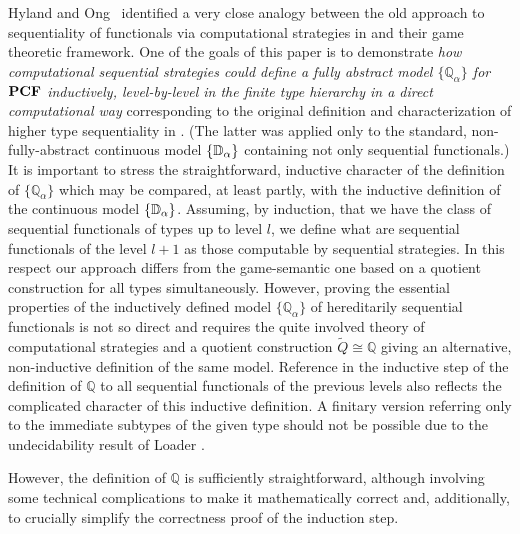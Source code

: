 \documentclass[fleqn]{LMCS}
\theoremstyle{plain}\newtheorem{satz}[thm]{Satz}
\theoremstyle{plain}\newtheorem{hyp}[thm]{Hypothesis}
\theoremstyle{plain}\newtheorem{hyps}[thm]{Hypotheses}
\theoremstyle{definition}\newtheorem{note}[thm]{Note}
\newcommand{\setof}[1]{\{#1\}}
\newcommand{\bbQ}{\mathbb{Q}}
\newcommand{\PCF}{\mbox{\bf PCF}}
\newcommand{\fla}[1]{$#1$}
\newcommand{\tQ}{\tilde{Q}}
\newcommand{\?}{\mbox{?}}
\begin{document}
Hyland and Ong~\cite{Hyland-Ong2000} 
identified a very close analogy between the old approach 
to sequentiality of functionals via computational strategies in \cite{Saz76AL} 
and their game theoretic framework. 
One of the goals of this paper is to demonstrate 
\emph{how computational 
sequential strategies could define a fully abstract model $\setof{\bbQ_\alpha}$ 
for \fla{\PCF} inductively, level-by-level in the finite type hierarchy 
in a direct computational way} corresponding to 
the original definition and characterization of higher type sequentiality 
in \cite{Saz76SMZH,Saz76AL}. (The latter was applied only to the standard, 
non-fully-abstract continuous 
model $\setof{\bbD_\alpha}$ containing not only sequential functionals.) 
It is important to stress the straightforward, inductive 
character of the definition of $\setof{\bbQ_\alpha}$ which may be compared, 
at least partly, with the inductive definition of the continuous model 
$\setof{\bbD_{\alpha}}$. 
Assuming, by induction, that we have 
the class of sequential functionals 
of types up to level $l$, we define what are sequential functionals 
of the level $l+1$ as those computable by sequential strategies. 
In this respect our approach differs from the game-semantic one 
based on a quotient construction for all types simultaneously. 
However, 
proving the essential properties of the inductively defined model $\setof{\bbQ_\alpha}$ 
of hereditarily sequential functionals is not so direct and 
requires the quite involved theory of computational strategies 
and a quotient construction $\tQ\cong\bbQ$ giving an alternative, non-inductive 
definition of the same model. Reference in the inductive step of the definition 
of $\bbQ$ to all 
sequential functionals of the previous levels also reflects the complicated 
character of this inductive definition. A finitary version referring only to 
the immediate subtypes of the given type should not be possible due to 
the undecidability result 
of Loader \cite{LoaderTCS2001}. 





However, the definition of $\bbQ$ is sufficiently straightforward, although involving 
some technical complications to make it mathematically correct and, additionally, 
to crucially simplify the correctness proof of the induction step. 
\end{document}

